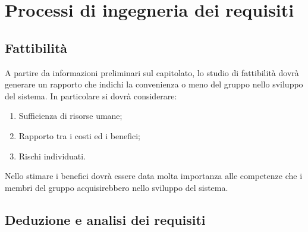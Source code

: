 \section{Processi di ingegneria dei requisiti}{
	\subsection{Fattibilit\`{a}}{
		A partire da informazioni preliminari sul capitolato, lo studio di fattibilit\`{a} dovr\`{a} generare un rapporto che indichi la convenienza o meno del gruppo nello sviluppo del sistema. In particolare si dovr\`{a} considerare:
		\begin{enumerate}
			\item Sufficienza di risorse umane;
			\item Rapporto tra i costi ed i benefici;
			\item Rischi individuati.
		\end{enumerate}
		Nello stimare i benefici dovr\`{a} essere data molta importanza alle competenze che i membri del gruppo acquisirebbero nello sviluppo del sistema.
	 }
	\subsection{Deduzione e analisi dei requisiti}{ 
}}
